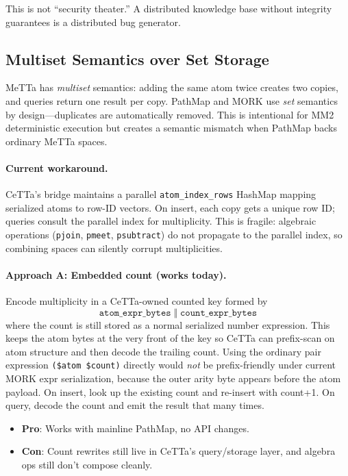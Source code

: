 \documentclass[11pt]{article}
\newcommand{\code}[1]{\texttt{#1}}
\newcommand{\CeTTa}{\textup{CeTTa}}
\newcommand{\PathMap}{\textup{PathMap}}
\newcommand{\MORK}{\textup{MORK}}
\newcommand{\MeTTa}{\textup{MeTTa}}
\begin{document}
This is not ``security theater.''  A distributed knowledge base without
integrity guarantees is a distributed bug generator.

\subsection{Multiset Semantics over Set Storage}
\label{sec:multiset-future}

\MeTTa{} has \emph{multiset} semantics: adding the same atom twice creates
two copies, and queries return one result per copy.  \PathMap{} and \MORK{}
use \emph{set} semantics by design---duplicates are automatically removed.
This is intentional for MM2 deterministic execution but creates a semantic
mismatch when \PathMap{} backs ordinary \MeTTa{} spaces.

\paragraph{Current workaround.}
\CeTTa{}'s bridge maintains a parallel \code{atom\_index\_rows} HashMap
mapping serialized atoms to row-ID vectors.  On insert, each copy gets a
unique row ID; queries consult the parallel index for multiplicity.
This is fragile: algebraic operations (\code{pjoin}, \code{pmeet},
\code{psubtract}) do not propagate to the parallel index, so combining
spaces can silently corrupt multiplicities.

\paragraph{Approach A: Embedded count (works today).}
Encode multiplicity in a CeTTa-owned counted key formed by
\[
  \texttt{atom\_expr\_bytes} \;\Vert\; \texttt{count\_expr\_bytes}
\]
where the count is still stored as a normal serialized number expression.
This keeps the atom bytes at the very front of the key so CeTTa can prefix-scan
on atom structure and then decode the trailing count.  Using the ordinary pair
expression \code{(\$atom \$count)} directly would \emph{not} be prefix-friendly
under current MORK expr serialization, because the outer arity byte appears
before the atom payload.  On insert, look up the existing count and re-insert
with count+1.  On query, decode the count and emit the result that many times.
\begin{itemize}[nosep]
  \item \textbf{Pro}: Works with mainline \PathMap{}, no API changes.
  \item \textbf{Con}: Count rewrites still live in CeTTa's query/storage layer,
    and algebra ops still don't compose cleanly.
\end{itemize}
\end{document}
